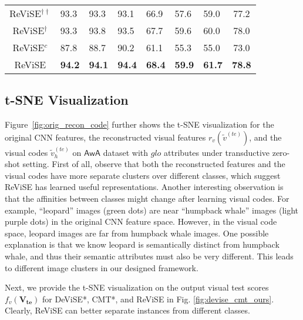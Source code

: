 {{\begin{table}[t!]
{\begin{tabular}{|c||lll||lll||c|}
ReViSE$^{\dagger\dagger}$ &  93.3    &    93.3     &   93.1   &   66.9      &    57.6    &   59.0    &   77.2  \\
ReViSE$^{\dagger}$ &   93.3  &  93.8  &     93.5       &  67.7  &   59.6    &     60.0    &   78.0  \\
ReViSE$^{c}$ &   87.8 &  88.7 &    90.2     &  61.1 &   55.3  &  55.0   &  73.0 \\
ReViSE     &    {\bf 94.2}    &    {\bf 94.1}   &  {\bf 94.4}  &   {\bf 68.4}   &  {\bf 59.9} &  {\bf 61.7}    &    {\bf 78.8}    \\ \hline
\end{tabular}
}
\vspace{-4mm}
\label{tbl:few_recog}
\end{table}

}

\subsection{t-SNE Visualization}
\label{subsec:tsne}
{

Figure~\ref{fig:orig_recon_code} further shows the t-SNE \cite{maaten2008visualizing} visualization for the original CNN features, the reconstructed visual features $r_v(\tilde{v}^{(te)})$, and the visual codes $\tilde{v}_h^{(te)}$ on $\mathsf{AwA}$ dataset with $\textit{glo}$ attributes under transductive zero-shot setting. 
First of all, observe that both the reconstructed features and the visual codes have more separate clusters over different classes, which suggest ReViSE has learned useful representations. Another interesting observation is that the affinities between classes might change after learning visual codes. For example, ``leopard'' images (green dots) are near ``humpback whale'' images (light purple dots) in the original CNN feature space. However, in the visual code space, leopard images are far from humpback whale images. One possible explanation is that we know leopard is semantically distinct from humpback whale, and thus their semantic attributes must also be very different. This leads to different image clusters in our designed framework.

Next, we provide the t-SNE visualization on the output visual test scores $f_v(\mathbf{V_{te}})$ for DeViSE*, CMT*, and ReViSE in Fig. \ref{fig:devise_cmt_ours}. Clearly, ReViSE can better separate instances from different classes. 



}}
